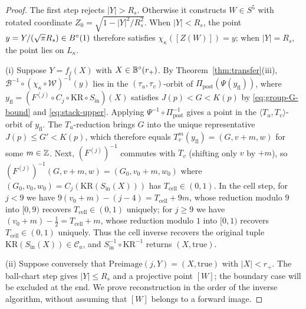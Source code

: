\begin{proof}
The first step rejects $|Y|>R_s$. Otherwise it constructs $W\in S^5$ with rotated coordinate
$Z_0=\sqrt{1-|Y|^2/R_s^2}$. When $|Y|<R_s$, the point $y=Y/(\sqrt\pi R_s)\in B^{\circ}(1)$ therefore satisfies
$\chi_\kappa([Z(W)])=y$; when $|Y|=R_s$, the point lies on $L_\kappa$.

(i) Suppose $Y=f_j(X)$ with $X\in\mathbb{B}^{\circ}(r_+)$. By Theorem~\ref{thm:transfer}(iii), $\mathcal B^{-1}\circ(\chi_\kappa\circ\mathcal W)^{-1}(y)$
lies in the $(\tau_u,\tau_v)$-orbit of $\Pi_{\mathrm{post}}(\Psi(y_{\mathrm{fl}}))$, where
$y_{\mathrm{fl}}=(F^{(j)}\circ C_j\circ\mathrm{KR}\circ S_{\mathrm{in}})(X)$ satisfies $J(p)<G<K(p)$ by
\eqref{eq:group-G-bound} and \eqref{eq:stack-upper}. Applying $\Psi^{-1}\circ\Pi_{\mathrm{post}}^{-1}$ gives a point in the
$\langle T_u,T_v\rangle$-orbit of $y_{\mathrm{fl}}$. The $T_u$-reduction brings $G$ into the unique representative
$J(p)\le G'<K(p)$, which therefore equals $T_v^m(y_{\mathrm{fl}})=(G,v+m,w)$ for some $m\in\mathbb{Z}$. Next, $(F^{(j)})^{-1}$
commutes with $T_v$ (shifting only $v$ by $+m$), so $(F^{(j)})^{-1}(G,v+m,w)=(G_0,v_0+m,w_0)$ where
$(G_0,v_0,w_0)=C_j(\mathrm{KR}(S_{\mathrm{in}}(X)))$ has $T_{\mathrm{cell}}\in(0,1)$. In the cell step, for
$j<9$ we have $9(v_0+m)-(j-4)=T_{\mathrm{cell}}+9m$, whose reduction modulo $9$ into $[0,9)$ recovers $T_{\mathrm{cell}}\in(0,1)$
uniquely; for $j\ge9$ we have $(v_0+m)-\frac12=T_{\mathrm{cell}}+m$, whose reduction modulo $1$ into $[0,1)$ recovers
$T_{\mathrm{cell}}\in(0,1)$ uniquely. Thus the cell inverse recovers the original tuple $\mathrm{KR}(S_{\mathrm{in}}(X))\in\mathcal C_a$,
and $S_{\mathrm{in}}^{-1}\circ\mathrm{KR}^{-1}$ returns $(X,\mathrm{true})$.

(ii) Suppose conversely that $\mathrm{Preimage}(j,Y)=(X,\mathrm{true})$ with $|X|<r_+$.
The ball-chart step gives $|Y|\le R_s$ and a projective point $[W]$; the boundary case will be excluded at the end.
We prove reconstruction in the order of the inverse algorithm, without assuming that $[W]$ belongs to a forward image.


\end{proof}
